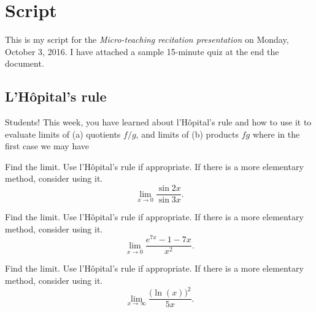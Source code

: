 \documentclass[article,oneside]{memoir}
\begin{document}
%

\author{\textti{\auth}}%
\title{\textti{\tight}}%
\date{\textti{\due}}%

\thispagestyle{empty}
\frontmatter
\maketitle%
\tableofcontents*%
\newpage

\mainmatter
\chapter{Script}
This is my script for the \emph{Micro-teaching recitation presentation} on
Monday, October 3, 2016. I have attached a sample 15-minute quiz at the end
the document.

\section{L'Hôpital's rule}
Students! This week, you have learned about l'Hôpital's rule and how to use
it to evaluate limits of (a) quotients \(f/g\), and limits of (b) products
\(fg\) where in the first case we may have


\begin{problem*}[WebAssign, \# 2]
  Find the limit. Use l'Hôpital's rule if appropriate. If there is a more
  elementary method, consider using it.
  \[
    \lim_{x\to 0}\frac{\sin 2x}{\sin 3x}.
  \]
\end{problem*}
\begin{solution*}
\end{solution*}

\begin{problem*}[WebAssign, \# 3]
  Find the limit. Use l'Hôpital's rule if appropriate. If there is a more
  elementary method, consider using it.
  \[
    \lim_{x\to 0}\frac{e^{7x}-1-7x}{x^2}.
  \]
\end{problem*}
\begin{solution*}
\end{solution*}

\begin{problem*}[WebAssign, \# 4]
  Find the limit. Use l'Hôpital's rule if appropriate. If there is a more
  elementary method, consider using it.
  \[
    \lim_{x\to\infty}\frac{\bigl( \ln(x) \bigr)^2}{5x}.
  \]
\end{problem*}
\begin{solution*}
\end{solution*}
\end{document}
